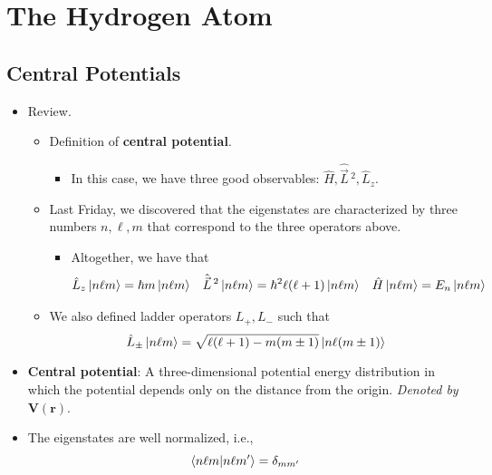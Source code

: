 \documentclass[../notes.tex]{subfiles}
\begin{document}
\chapter{The Hydrogen Atom}
\section{Central Potentials}
\begin{itemize}
    \item {}Review.
    \begin{itemize}
        \item Definition of \textbf{central potential}.
        \begin{itemize}
            \item In this case, we have three good observables: $\hat{H},\hat{\vec{L}}{\,}^2,\hat{L}_z$.
        \end{itemize}
        \item Last Friday, we discovered that the eigenstates are characterized by three numbers $n,\ell,m$ that correspond to the three operators above.
        \begin{itemize}
            \item Altogether, we have that
            \begin{align*}
                \hat{L}_z\ket{n\ell m} &= \hbar m\ket{n\ell m}&
                \hat{\vec{L}}{\,}^2\ket{n\ell m} &= \hbar^2\ell(\ell+1)\ket{n\ell m}&
                \hat{H}\ket{n\ell m} &= E_n\ket{n\ell m}
            \end{align*}
        \end{itemize}
        \item We also defined ladder operators $L_+,L_-$ such that
        \begin{equation*}
            \hat{L}_\pm\ket{n\ell m} = \sqrt{\ell(\ell+1)-m(m\pm 1)}\ket{n\ell(m\pm 1)}
        \end{equation*}
    \end{itemize}
    \item \textbf{Central potential}: A three-dimensional potential energy distribution in which the potential depends only on the distance from the origin. \emph{Denoted by} $\bm{V(r)}$.
    \item The eigenstates are well normalized, i.e.,
    \begin{equation*}
        \braket{n\ell m}{n\ell m'} = \delta_{mm'}
    \end{equation*}
    \begin{itemize}

\end{itemize}
\end{itemize}
\end{document}
